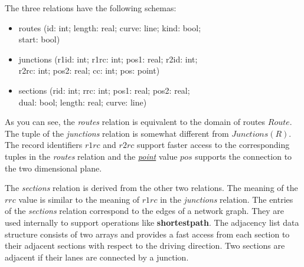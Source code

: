 \documentclass[a4paper]{article}
\newcommand{\op}[1]{\textbf{#1}}
\newcommand{\dt}[1]{\textsl{\underline{#1}}}
\begin{document}
The three relations have the following schemas:
\begin{ttfamily}
\begin{itemize}
  \item [] routes (id: int; length: real; curve: line; kind: bool;\\
 start: bool)
  \item [] junctions (r1id: int; r1rc: int; pos1: real; r2id: int;\\
r2rc: int; pos2: real; cc: int; pos: point)
  \item [] sections (rid: int; rrc: int; pos1: real; pos2: real;\\
dual: bool; length: real; curve: line)
\end{itemize}
\end{ttfamily}
As you can see, the \textit{routes} relation is equivalent to the domain of routes
$Route$.
The tuple of the \textit{junctions} relation is somewhat different from $Junctions(R)$.
The record identifiers $r1rc$ and $r2rc$ support faster access to the
corresponding
tuples in the \textit{routes} relation and the \dt{point} value $pos$ supports the
connection
to the two dimensional plane.

The \textit{sections} relation is derived from the other two relations. The meaning of
the $rrc$ value is similar to the meaning of $r1rc$ in the \textit{junctions} relation.
The entries of the \textit{sections} relation correspond to the edges of a network
graph.
They are used internally to support operations like \op{shortestpath}. The
adjacency
list data structure consists of two arrays and provides a fast
access from each section to their adjacent sections with respect to the driving
direction. Two sections are adjacent if their lanes are connected by a junction.
\end{document}
